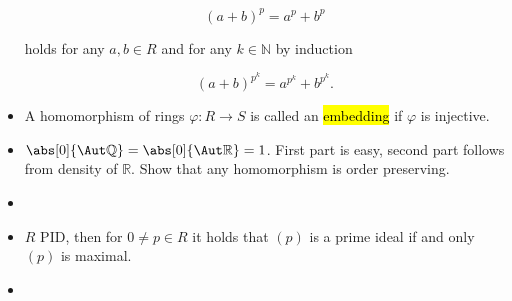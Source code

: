 \begin{itemize}
		\begin{equation}
			(a + b)^p = a^p + b^p
		\end{equation}

		\noindent holds for any $a,b \in R$ and for any $k \in \mathbb{N}$ by induction

		\begin{equation}
			(a + b)^{p^k} = a^{p^k} + b^{p^k}.
		\end{equation}

	\item A homomorphism of rings $\varphi: R \to S$ is called an \hl{embedding} if $\varphi$ is injective.

	\item $\abs[0]{\Aut \mathbb{Q}} = \abs[0]{\Aut \mathbb{R}} = 1$. First part is easy, second part follows from density of $\mathbb{R}$. Show that any homomorphism is order preserving.

	\item 
	\item $R$ PID, then for $0 \neq p \in R$ it holds that $(p)$ is a prime ideal if and only $(p)$ is maximal.

	\item 
\end{itemize}
